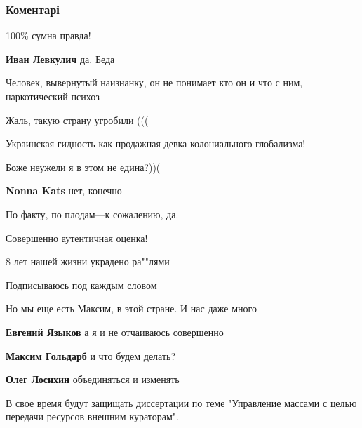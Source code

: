  
 
 
 
 
\subsubsection{Коментарі}
\label{sec:21_11_2021.fb.goldarb_maksim.1.den_razloma_gosudarstva.cmt}

\begin{itemize} %
100\% сумна правда!

\textbf{Иван Левкулич} да. Беда

Человек, вывернутый наизнанку, он не понимает кто он и что с ним, наркотический психоз

Жаль, такую страну угробили (((

Украинская гидность как продажная девка колониального глобализма!

Боже неужели я в этом не едина?))(

\textbf{Nonna Kats} нет, конечно

По факту, по плодам—к сожалению, да.

Совершенно аутентичная оценка!

8 лет нашей жизни украдено ра""лями

Подписываюсь под каждым словом

Но мы еще есть Максим, в этой стране.
И нас даже много

\begin{itemize} %
\textbf{Евгений Языков} а я и не отчаиваюсь совершенно

\textbf{Максим Гольдарб} и что будем делать?

\textbf{Олег Лосихин} объединяться и изменять
\end{itemize} %

В свое время будут защищать диссертации по теме "Управление массами с целью передачи ресурсов внешним кураторам".


\end{itemize}
